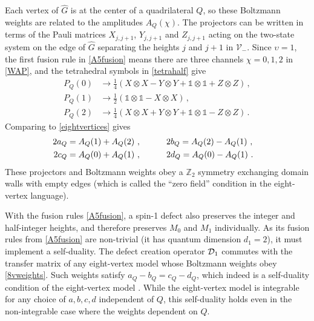 Each vertex of $\widehat{G}$ is at the center of a quadrilateral $Q$, so these Boltzmann weights are related to the amplitudes $A_Q(\chi)$.  The projectors can be written in terms of the Pauli matrices $X_{j,j+1}$, $Y_{j,j+1}$ and $Z_{j,j+1}$ acting on the two-state system on the edge of $\widehat{G}$ separating the heights $j$ and $j+1$ in $\mathcal{V}_-$. Since $\upsilon =1$, the first fusion rule in \eqref{A5fusion} means there are three channels $\chi=0,1,2$ in \eqref{WAP}, and the tetrahedral symbols in \eqref{tetrahalf} give
\begin{subequations} \label{P012} \begin{align}
	P_Q(0) &\rightarrow \frac{1}{4}\left( X\otimes X - Y \otimes Y + \mathds{1}\otimes \mathds{1} + Z\otimes Z \right) \,,\\
	P_Q(1) &\rightarrow \frac{1}{2}\left( \mathds{1}\otimes \mathds{1} -X\otimes X  \right) \,,\\
	P_Q(2) &\rightarrow \frac{1}{4}\left( X\otimes X + Y \otimes Y + \mathds{1}\otimes \mathds{1} - Z\otimes Z \right) \,.
\end{align} \end{subequations}
Comparing to \eqref{eightvertices} gives
\begin{align} \begin{aligned}
2a_Q&= A_Q(1) + A_Q(2)\ ,\qquad\quad 2b_Q = A_Q(2)-A_Q(1)\ ,\cr 
2c_Q &= A_Q(0)+A_Q(1)\ ,\qquad\quad 2d_Q=A_Q(0)-A_Q(1)\ .
\end{aligned} \label{8vweights}
\end{align}
These projectors and Boltzmann weights obey a $\mathbb{Z}_2$ symmetry exchanging domain walls with empty edges (which is called the ``zero field'' condition in the eight-vertex language).  

With the fusion rules \eqref{A5fusion}, a spin-1 defect also preserves the integer and half-integer heights, and therefore preserves $M_0$ and $M_1$ individually. As its fusion rules from \eqref{A5fusion} are non-trivial (it has quantum dimension $d_1=2$), it must implement a {self-duality}.  The defect creation operator $\mathcal{D}_1$ commutes with the transfer matrix of any eight-vertex model whose Boltzmann weights obey \eqref{8vweights}. Such weights satisfy $a_Q-b_Q=c_Q-d_Q$, which indeed is a self-duality condition of the eight-vertex model \cite{Baxter1978,Wu1989}. While the eight-vertex model is integrable for any choice of $a,b,c,d$ independent of $Q$, this self-duality holds even in the non-integrable case where the weights dependent on $Q$.

